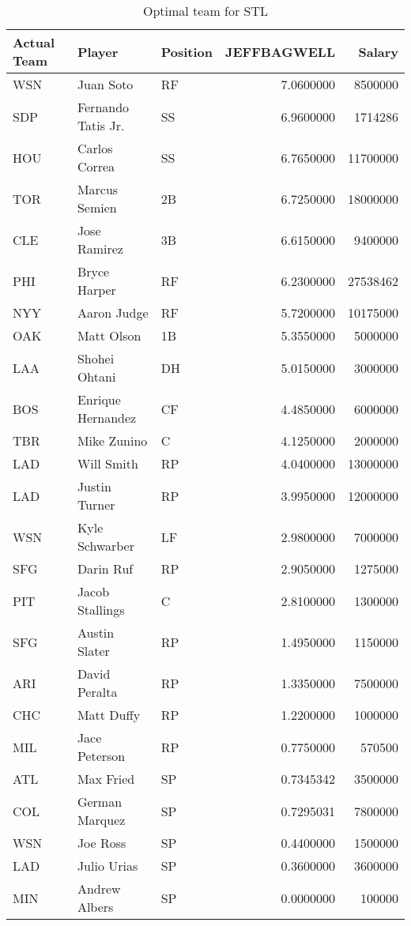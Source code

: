 \begin{table}

\caption{Optimal team for STL}
\centering
\begin{tabular}[t]{l|l|l|r|r}
\hline
Actual Team & Player & Position & JEFFBAGWELL & Salary\\
\hline
WSN & Juan Soto & RF & 7.0600000 & 8500000\\
\hline
SDP & Fernando Tatis Jr. & SS & 6.9600000 & 1714286\\
\hline
HOU & Carlos Correa & SS & 6.7650000 & 11700000\\
\hline
TOR & Marcus Semien & 2B & 6.7250000 & 18000000\\
\hline
CLE & Jose Ramirez & 3B & 6.6150000 & 9400000\\
\hline
PHI & Bryce Harper & RF & 6.2300000 & 27538462\\
\hline
NYY & Aaron Judge & RF & 5.7200000 & 10175000\\
\hline
OAK & Matt Olson & 1B & 5.3550000 & 5000000\\
\hline
LAA & Shohei Ohtani & DH & 5.0150000 & 3000000\\
\hline
BOS & Enrique Hernandez & CF & 4.4850000 & 6000000\\
\hline
TBR & Mike Zunino & C & 4.1250000 & 2000000\\
\hline
LAD & Will Smith & RP & 4.0400000 & 13000000\\
\hline
LAD & Justin Turner & RP & 3.9950000 & 12000000\\
\hline
WSN & Kyle Schwarber & LF & 2.9800000 & 7000000\\
\hline
SFG & Darin Ruf & RP & 2.9050000 & 1275000\\
\hline
PIT & Jacob Stallings & C & 2.8100000 & 1300000\\
\hline
SFG & Austin Slater & RP & 1.4950000 & 1150000\\
\hline
ARI & David Peralta & RP & 1.3350000 & 7500000\\
\hline
CHC & Matt Duffy & RP & 1.2200000 & 1000000\\
\hline
MIL & Jace Peterson & RP & 0.7750000 & 570500\\
\hline
ATL & Max Fried & SP & 0.7345342 & 3500000\\
\hline
COL & German Marquez & SP & 0.7295031 & 7800000\\
\hline
WSN & Joe Ross & SP & 0.4400000 & 1500000\\
\hline
LAD & Julio Urias & SP & 0.3600000 & 3600000\\
\hline
MIN & Andrew Albers & SP & 0.0000000 & 100000\\
\hline
\end{tabular}
\end{table}
